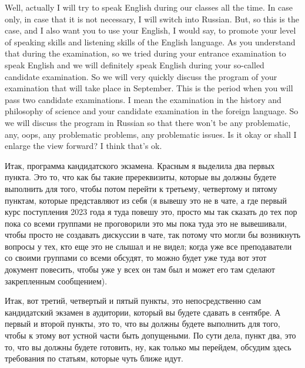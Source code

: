 \documentclass[main.tex]{subfiles}
\begin{document}


Well, actually I will try to speak English during our classes all the time. 
In case only, in case that it is not necessary, I will switch into Russian.
But, so this is the case, and I also want you to use your English, I would say, to promote your level of speaking skills and listening skills of the English language.
As you understand that during the examination, so we tried during your entrance examination to speak English and we will definitely speak English during your so-called candidate examination.
So we will very quickly discuss the program of your examination that will take place in September.
This is the period when you will pass two candidate examinations.
I mean the examination in the history and philosophy of science and your candidate examination in the foreign language.
So we will discuss the program in Russian so that there won't be any problematic, any, oops, any problematic problems, any problematic issues. Is it okay or shall I enlarge the view forward? I think that's ok.

Итак, программа кандидатского экзамена.
Красным я выделила два первых пункта.
Это то, что как бы такие пререквизиты, которые вы должны будете выполнить для того, чтобы потом перейти к третьему, четвертому и пятому пунктам, которые представляют из себя (я вывешу это не в чате, а где первый курс поступления 2023 года я туда повешу это, просто мы так сказать до тех пор пока со всеми группами не проговорили это мы пока туда это не вывешивали, чтобы просто не создавать дискуссии в чате, так потому что могли бы возникнуть вопросы у тех, кто еще это не слышал и не видел; когда уже все преподаватели со своими группами со всеми обсудят, то можно будет уже туда вот этот документ повесить, чтобы уже у всех он там был и может его там сделают закрепленным сообщением).
 
 Итак, вот третий, четвертый и пятый пункты, это непосредственно сам кандидатский экзамен в аудитории, который вы будете сдавать в сентябре.
 А первый и второй пункты, это то, что вы должны будете выполнить для того, чтобы к этому вот устной части быть допущеными.
 По сути дела, пункт два, это то, что вы должны будете готовить, ну, как только мы перейдем, обсудим здесь требования по статьям, которые чуть ближе идут.
 
\end{document}
